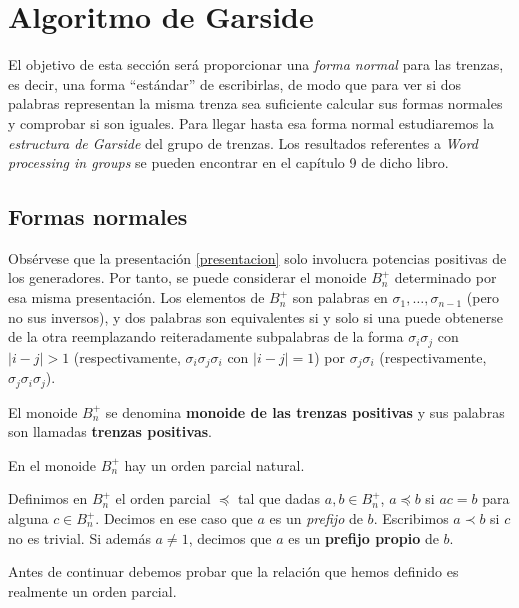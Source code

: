 \documentclass[bibtex, anon]{TEMat-article}
\begin{document}
\section{Algoritmo de Garside}
El objetivo de esta sección será proporcionar una \emph{forma normal} para las trenzas, es decir, una forma ``estándar'' de escribirlas, de modo que para ver si dos palabras representan la misma trenza sea suficiente calcular sus formas normales y comprobar si son iguales. Para llegar hasta esa forma normal estudiaremos la \emph{estructura de Garside} del grupo de trenzas. Los resultados referentes a \emph{Word processing in groups} \cite{Thurston} se pueden encontrar en el capítulo 9 de dicho libro.


\subsection{Formas normales}
Obsérvese que la presentación \ref{presentacion} solo involucra potencias positivas de los generadores. Por tanto, se puede considerar el monoide $B_n^+$ determinado por esa misma presentación. Los elementos de $B_n^+$ son palabras en $\sigma_1,\dots,\sigma_{n-1}$ (pero no sus inversos), y dos palabras son equivalentes si y solo si una puede obtenerse de la otra reemplazando reiteradamente subpalabras de la forma $\sigma_i\sigma_j$ con $|i-j|>1$ (respectivamente, $\sigma_i\sigma_j\sigma_i$ con $|i-j|=1$) por $\sigma_j\sigma_i$ (respectivamente, $\sigma_j\sigma_i\sigma_j$).

\begin{definicion}
	El monoide $B_n^+$ se denomina \textbf{monoide de las trenzas positivas} y sus palabras son llamadas \textbf{trenzas positivas}.
\end{definicion}
En el monoide $B_n^+$ hay un orden parcial natural. 
\begin{definicion}
	Definimos en $B_n^+$ el orden parcial $\preccurlyeq$ tal que dadas $a,b\in B_n^+$, $a\preccurlyeq b$ si $ac=b$ para alguna $c\in B_n^+$. Decimos en ese caso que $a$ es un \emph{prefijo} de $b$. Escribimos $a\prec b$ si $c$ no es trivial. Si además $a\neq 1$, decimos que $a$ es un \textbf{prefijo propio} de $b$. 
\end{definicion}

Antes de continuar debemos probar que la relación que hemos definido es realmente un orden parcial.
\end{document}
